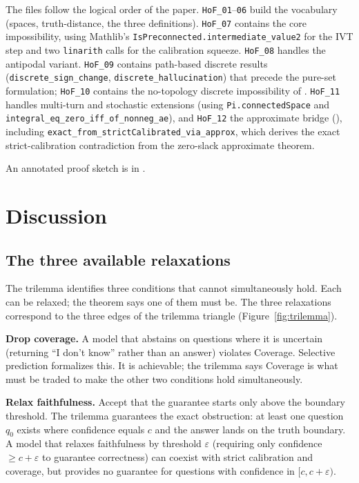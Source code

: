 \documentclass[10pt]{article}
\begin{document}
The files follow the logical order of the paper. \texttt{HoF\_01}--\texttt{06}
build the vocabulary (spaces, truth-distance, the three definitions).
\texttt{HoF\_07} contains the core impossibility, using Mathlib's
\texttt{IsPreconnected.intermediate\_value2} for the IVT step and two
\texttt{linarith} calls for the calibration squeeze.
\texttt{HoF\_08} handles the antipodal variant. \texttt{HoF\_09} contains
path-based discrete results (\texttt{discrete\_sign\_change},
\texttt{discrete\_hallucination}) that precede the pure-set formulation;
\texttt{HoF\_10} contains the no-topology discrete impossibility of
. \texttt{HoF\_11} handles multi-turn and stochastic
extensions (using \texttt{Pi.connectedSpace} and
\texttt{integral\_eq\_zero\_iff\_of\_nonneg\_ae}), and \texttt{HoF\_12}
the approximate bridge (), including
\texttt{exact\_from\_strictCalibrated\_via\_approx}, which derives the exact
strict-calibration contradiction from the zero-slack approximate theorem.

An annotated proof sketch is in .

\section{Discussion}
\label{sec:discussion}

\subsection{The three available relaxations}

The trilemma identifies three conditions that cannot simultaneously hold.
Each can be relaxed; the theorem says one of them must be. The three
relaxations correspond to the three edges of the trilemma triangle
(Figure~\ref{fig:trilemma}).

\textbf{Drop coverage.} A model that abstains on questions where it is
uncertain (returning ``I don't know'' rather than an answer) violates
Coverage. Selective prediction \citep{kamath2020selective,feng2020language}
formalizes this. It is achievable; the trilemma says Coverage is what
must be traded to make the other two conditions hold simultaneously.

\textbf{Relax faithfulness.} Accept that the guarantee starts only above the
boundary threshold. The trilemma guarantees the exact obstruction: at least
one question $q_0$ exists where confidence equals $c$ and the answer lands on
the truth boundary. A model that relaxes faithfulness by threshold
$\varepsilon$ (requiring only confidence $\geq c + \varepsilon$ to guarantee
correctness) can coexist with strict calibration and coverage, but provides no
guarantee for questions with confidence in $[c,c+\varepsilon)$.
\end{document}
